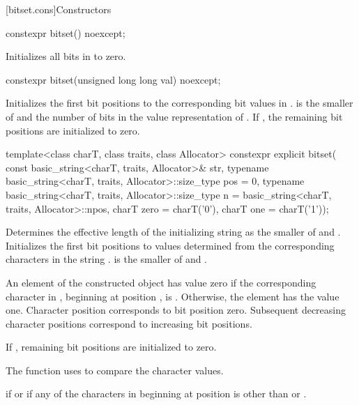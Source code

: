 [bitset.cons]{Constructors}

%
\begin{itemdecl}
constexpr bitset() noexcept;
\end{itemdecl}

\begin{itemdescr}
\pnum
\effects
Initializes all bits in  to zero.
\end{itemdescr}

%
\begin{itemdecl}
constexpr bitset(unsigned long long val) noexcept;
\end{itemdecl}

\begin{itemdescr}
\pnum
\effects
Initializes the first  bit positions to the corresponding bit
values in .
 is the smaller of  and the number of bits in the value
representation of .
If , the remaining bit positions are initialized to zero.
\end{itemdescr}

%
\begin{itemdecl}
template<class charT, class traits, class Allocator>
  constexpr explicit bitset(
    const basic_string<charT, traits, Allocator>& str,
    typename basic_string<charT, traits, Allocator>::size_type pos = 0,
    typename basic_string<charT, traits, Allocator>::size_type n
      = basic_string<charT, traits, Allocator>::npos,
    charT zero = charT('0'),
    charT one = charT('1'));
\end{itemdecl}

\begin{itemdescr}
\pnum
\effects
Determines the effective length
 of the initializing string as the smaller of
 and
.
Initializes the first  bit
positions to values determined from the corresponding characters in the string
.
 is the smaller of  and .

\pnum
An element of the constructed object has value zero if the
corresponding character in , beginning at position
, is
.
Otherwise, the element has the value one.
Character position  corresponds to bit position zero.
Subsequent decreasing character positions correspond to increasing bit positions.

\pnum
If , remaining bit positions are initialized to zero.

\pnum
The function uses 
to compare the character values.

\pnum
\throws
{}%
 if  or
%
 if any of
the  characters in 
beginning at position 
is other than  or .
\end{itemdescr}

